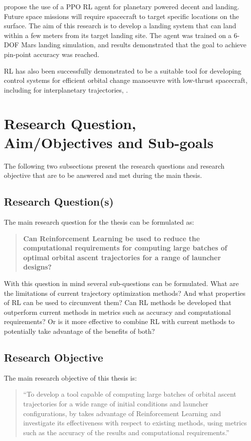 \documentclass[12pt, english, NoHyper]{AE4010-template}
\begin{document}
\cite{gaudet2018deep} propose the use of a PPO RL agent for planetary powered decent and landing. Future space missions will require spacecraft to target specific locations on the surface. The aim of this research is to develop a landing system that can land within a few meters from its target landing site. The agent was trained on a 6-DOF Mars landing simulation, and results demonstrated that the goal to achieve pin-point accuracy was reached.

RL has also been successfully demonstrated to be a suitable tool for developing control systems for efficient orbital change manoeuvre with low-thrust spacecraft, including for interplanetary trajectories, \cite{kolosa2019reinforcement, zavoli2020reinforcement, miller2020low}.

\section{Research Question, Aim/Objectives and Sub-goals}
The following two subsections present the research questions and research objective that are to be answered and met during the main thesis.

\subsection{Research Question(s)}
The main research question for the thesis can be formulated as:

\begin{quote}
\textbf{Can Reinforcement Learning be used to reduce the computational requirements for computing large batches of optimal orbital ascent trajectories for a range of launcher designs?}
\end{quote}

With this question in mind several sub-questions can be formulated. What are the limitations of current trajectory optimization methods? And what properties of RL can be used to circumvent them? Can RL methods be developed that outperform current methods in metrics such as accuracy and computational requirements? Or is it more effective to combine RL with current methods to potentially take advantage of the benefits of both?

\subsection{Research Objective}
\noindent The main research objective of this thesis is:

\begin{quote}
“To develop a tool capable of computing large batches of orbital ascent trajectories for a wide range of initial conditions and launcher configurations, by takes advantage of Reinforcement Learning and investigate its effectiveness with respect to existing methods, using metrics such as the accuracy of the results and computational requirements.”
\end{quote}
\end{document}
